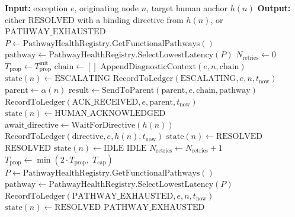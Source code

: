 \begin{algorithm}[htbp]
\caption{Bailout Protocol escalation algorithm.}
\label{alg:escalate}
\begin{algorithmic}[1]
\Statex \textbf{Input:} exception $e$, originating node $n$, target human anchor $h(n)$
\Statex \textbf{Output:} either $\text{RESOLVED}$ with a binding directive from $h(n)$, or $\text{PATHWAY\_EXHAUSTED}$
\Statex
{}
  \State $P \leftarrow \text{PathwayHealthRegistry.GetFunctionalPathways}()$
  \State $\text{pathway} \leftarrow \text{PathwayHealthRegistry.SelectLowestLatency}(P)$
  \State $N_{\text{retries}} \leftarrow 0$
  \State $T_{\text{prop}} \leftarrow T_{\text{prop}}^{\text{init}}$
  \State $\text{chain} \leftarrow []$
  \State $\text{AppendDiagnosticContext}(e, n, \text{chain})$
  \State $\text{state}(n) \leftarrow \text{ESCALATING}$
  \State $\text{RecordToLedger}(\text{ESCALATING}, e, n, t_{\text{now}})$
  \State
    \State $\text{parent} \leftarrow \alpha(n)$
    \State $\text{result} \leftarrow \text{SendToParent}(\text{parent}, e, \text{chain}, \text{pathway})$
    \State
      \State $\text{RecordToLedger}(\text{ACK\_RECEIVED}, e, \text{parent}, t_{\text{now}})$
      \State $\text{state}(n) \leftarrow \text{HUMAN\_ACKNOWLEDGED}$
      \State $\text{await\_directive} \leftarrow \text{WaitForDirective}(h(n))$
      \State
        \State $\text{RecordToLedger}(\text{directive}, e, h(n), t_{\text{now}})$
        \State $\text{state}(n) \leftarrow \text{RESOLVED}$
        \State \Return $\text{RESOLVED}$
        \State $\text{state}(n) \leftarrow \text{IDLE}$
        \State \Return $\text{IDLE}$
      \EndIf
      \State $N_{\text{retries}} \leftarrow N_{\text{retries}} + 1$
      \State $T_{\text{prop}} \leftarrow \min(2 \cdot T_{\text{prop}},\; T_{\text{cap}})$
      \State $P \leftarrow \text{PathwayHealthRegistry.GetFunctionalPathways}()$
      \State $\text{pathway} \leftarrow \text{PathwayHealthRegistry.SelectLowestLatency}(P)$
      \State $\text{RecordToLedger}(\text{PATHWAY\_EXHAUSTED}, e, n, t_{\text{now}})$
      \State $\text{state}(n) \leftarrow \text{RESOLVED}$
      \State \Return $\text{PATHWAY\_EXHAUSTED}$
    \EndIf
  \EndWhile

\end{algorithmic}
\end{algorithm}
